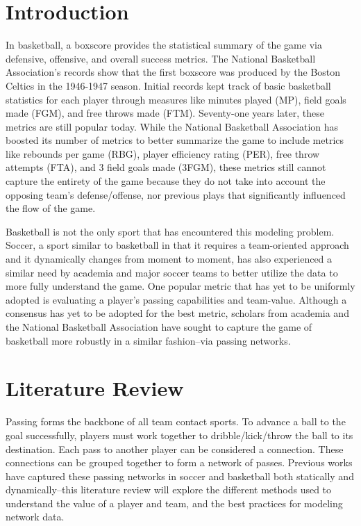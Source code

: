 \documentclass[12pt,twoside]{dukestatscithesis}
\theoremstyle{definition}
\theoremstyle{definition}
\theoremstyle{definition}
\theoremstyle{remark}
\begin{document}
\chapter{Introduction}\label{introduction}

In basketball, a boxscore provides the statistical summary of the game
via defensive, offensive, and overall success metrics. The National
Basketball Association's records show that the first boxscore was
produced by the Boston Celtics in the 1946-1947 season. Initial records
kept track of basic basketball statistics for each player through
measures like minutes played (MP), field goals made (FGM), and free
throws made (FTM). Seventy-one years later, these metrics are still
popular today. While the National Basketball Association has boosted its
number of metrics to better summarize the game to include metrics like
rebounds per game (RBG), player efficiency rating (PER), free throw
attempts (FTA), and 3 field goals made (3FGM), these metrics still
cannot capture the entirety of the game because they do not take into
account the opposing team's defense/offense, nor previous plays that
significantly influenced the flow of the game.

Basketball is not the only sport that has encountered this modeling
problem. Soccer, a sport similar to basketball in that it requires a
team-oriented approach and it dynamically changes from moment to moment,
has also experienced a similar need by academia and major soccer teams
to better utilize the data to more fully understand the game. One
popular metric that has yet to be uniformly adopted is evaluating a
player's passing capabilities and team-value. Although a consensus has
yet to be adopted for the best metric, scholars from academia and the
National Basketball Association have sought to capture the game of
basketball more robustly in a similar fashion--via passing networks.

\chapter{Literature Review}\label{rmd-basics}

Passing forms the backbone of all team contact sports. To advance a ball
to the goal successfully, players must work together to
dribble/kick/throw the ball to its destination. Each pass to another
player can be considered a connection. These connections can be grouped
together to form a network of passes. Previous works have captured these
passing networks in soccer and basketball both statically and
dynamically--this literature review will explore the different methods
used to understand the value of a player and team, and the best
practices for modeling network data.
\end{document}
